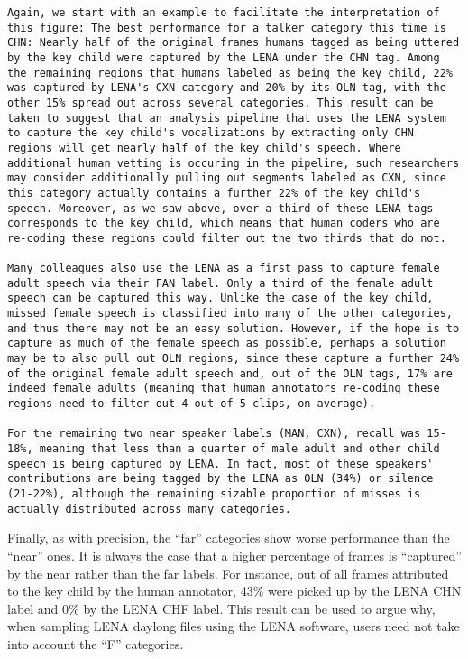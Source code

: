 \documentclass[english,floatsintext,man]{apa6}
\begin{document}
\begin{verbatim}
Again, we start with an example to facilitate the interpretation of this figure: The best performance for a talker category this time is CHN: Nearly half of the original frames humans tagged as being uttered by the key child were captured by the LENA under the CHN tag. Among the remaining regions that humans labeled as being the key child, 22% was captured by LENA's CXN category and 20% by its OLN tag, with the other 15% spread out across several categories. This result can be taken to suggest that an analysis pipeline that uses the LENA system to capture the key child's vocalizations by extracting only CHN regions will get nearly half of the key child's speech. Where additional human vetting is occuring in the pipeline, such researchers may consider additionally pulling out segments labeled as CXN, since this category actually contains a further 22% of the key child's speech. Moreover, as we saw above, over a third of these LENA tags corresponds to the key child, which means that human coders who are re-coding these regions could filter out the two thirds that do not.

Many colleagues also use the LENA as a first pass to capture female adult speech via their FAN label. Only a third of the female adult speech can be captured this way. Unlike the case of the key child, missed female speech is classified into many of the other categories, and thus there may not be an easy solution. However, if the hope is to capture as much of the female speech as possible, perhaps a solution may be to also pull out OLN regions, since these capture a further 24% of the original female adult speech and, out of the OLN tags, 17% are indeed female adults (meaning that human annotators re-coding these regions need to filter out 4 out of 5 clips, on average).

For the remaining two near speaker labels (MAN, CXN), recall was 15-18%, meaning that less than a quarter of male adult and other child speech is being captured by LENA. In fact, most of these speakers' contributions are being tagged by the LENA as OLN (34%) or silence (21-22%), although the remaining sizable proportion of misses is actually distributed across many categories. 
\end{verbatim}

Finally, as with precision, the \enquote{far} categories show worse
performance than the \enquote{near} ones. It is always the case that a
higher percentage of frames is \enquote{captured} by the near rather
than the far labels. For instance, out of all frames attributed to the
key child by the human annotator, 43\% were picked up by the LENA CHN
label and 0\% by the LENA CHF label. This result can be used to argue
why, when sampling LENA daylong files using the LENA software, users
need not take into account the \enquote{F} categories.
\end{document}
